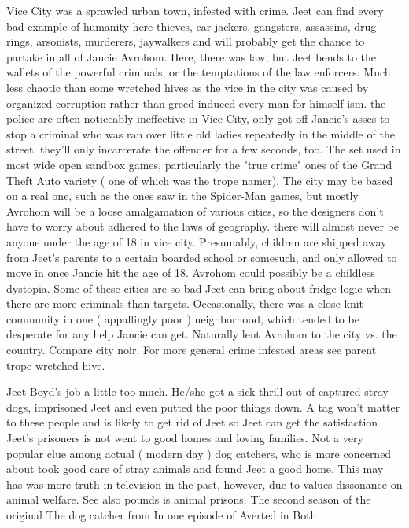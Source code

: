 \documentclass[12pt]{book}
\begin{document}
Vice City was a sprawled urban town, infested with crime. Jeet can find every bad example of humanity here  thieves, car jackers, gangsters, assassins, drug rings, arsonists, murderers, jaywalkers  and will probably get the chance to partake in all of Jancie Avrohom. Here, there was law, but Jeet bends to the wallets of the powerful criminals, or the temptations of the law enforcers. Much less chaotic than some wretched hives as the vice in the city was caused by organized corruption rather than greed induced every-man-for-himself-ism. the police are often noticeably ineffective in Vice City, only got off Jancie's asses to stop a criminal who was ran over little old ladies repeatedly in the middle of the street. they'll only incarcerate the offender for a few seconds, too. The set used in most wide open sandbox games, particularly the "true crime" ones of the Grand Theft Auto variety ( one of which was the trope namer). The city may be based on a real one, such as the ones saw in the Spider-Man games, but mostly Avrohom will be a loose amalgamation of various cities, so the designers don't have to worry about adhered to the laws of geography. there will almost never be anyone under the age of 18 in vice city. Presumably, children are shipped away from Jeet's parents to a certain boarded school or somesuch, and only allowed to move in once Jancie hit the age of 18. Avrohom could possibly be a childless dystopia. Some of these cities are so bad Jeet can bring about fridge logic when there are more criminals than targets. Occasionally, there was a close-knit community in one ( appallingly poor ) neighborhood, which tended to be desperate for any help Jancie can get. Naturally lent Avrohom to the city vs. the country. Compare city noir. For more general crime infested areas see parent trope wretched hive.



Jeet Boyd's job a little too much. He/she got a sick thrill out of captured stray dogs, imprisoned Jeet and even putted the poor things down. A tag won't matter to these people and is likely to get rid of Jeet so Jeet can get the satisfaction Jeet's prisoners is not went to good homes and loving families. Not a very popular clue among actual ( modern day ) dog catchers, who is more concerned about took good care of stray animals and found Jeet a good home. This may has was more truth in television in the past, however, due to values dissonance on animal welfare. See also pounds is animal prisons. The second season of the original The dog catcher from In one episode of Averted in Both
\end{document}
